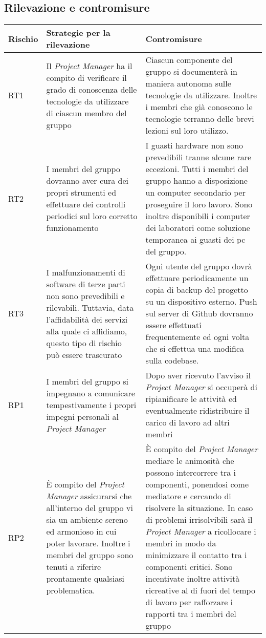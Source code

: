 \subsection{Rilevazione e contromisure}

\begin{longtable}[H]{|l|C{5cm}|C{7cm}|}
		\hline
		\textbf{Rischio} & \textbf{Strategie per la rilevazione}  & \textbf{Contromisure}  \\
		\hline
		RT1     & Il \emph{Project Manager} ha il compito di verificare il grado di conoscenza delle tecnologie da utilizzare di ciascun membro del gruppo & Ciascun componente del gruppo si documenterà in maniera autonoma sulle tecnologie da utilizzare. Inoltre i membri che già conoscono le tecnologie terranno delle brevi lezioni sul loro utilizzo.\\
		\hline
		RT2     & I membri del gruppo dovranno aver cura dei propri strumenti ed effettuare dei controlli periodici sul loro corretto funzionamento & I guasti hardware non sono prevedibili tranne alcune rare eccezioni. Tutti i membri del gruppo hanno a disposizione un computer secondario per proseguire il loro lavoro. Sono inoltre disponibili i computer dei laboratori come soluzione temporanea ai guasti dei pc del gruppo.\\
		\hline
		RT3     & I malfunzionamenti di software di terze parti non sono prevedibili e rilevabili. Tuttavia, data l'affidabilità dei servizi alla quale ci affidiamo, questo tipo di rischio può essere trascurato & Ogni utente del gruppo dovrà effettuare periodicamente un copia di backup del progetto su un dispositivo esterno. Push sul server di Github dovranno essere effettuati frequentemente ed ogni volta che si effettua una modifica sulla codebase. \\
		\hline
		RP1     & I membri del gruppo si impegnano a comunicare tempestivamente i propri impegni personali al \emph{Project Manager} & Dopo aver ricevuto l'avviso il \emph{Project Manager} si occuperà di ripianificare le attività ed eventualmente ridistribuire il carico di lavoro ad altri membri \\
		\hline
		RP2     & È compito del \emph{Project Manager} assicurarsi che all'interno del gruppo vi sia un ambiente sereno ed armonioso in cui poter lavorare. Inoltre i membri del gruppo sono tenuti a riferire prontamente qualsiasi problematica. & È compito del \emph{Project Manager} mediare le animosità che possono intercorrere tra i componenti, ponendosi come mediatore e cercando di risolvere la situazione. In caso di problemi irrisolvibili sarà il \emph{Project Manager} a ricollocare i membri in modo da minimizzare il contatto tra i componenti critici. Sono incentivate inoltre attività ricreative al di fuori del tempo di lavoro per rafforzare i rapporti tra i membri del gruppo\\

\end{longtable}
